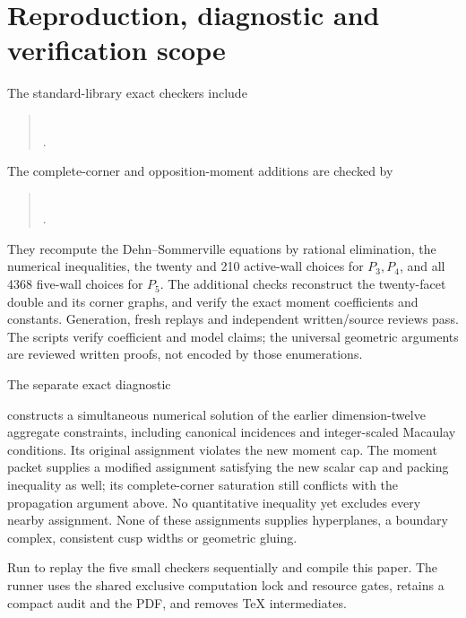 \documentclass[11pt]{article}
\begin{document}
\section{Reproduction, diagnostic and verification scope}
The standard-library exact checkers include
\begin{quote}\small
{}\\
.
\end{quote}
The complete-corner and opposition-moment additions are checked by
\begin{quote}\small
{}\\
.
\end{quote}
They recompute the Dehn--Sommerville equations by rational elimination,
the numerical inequalities, the twenty and 210 active-wall choices
for $P_3,P_4$, and all 4368 five-wall choices for $P_5$.
The additional checks reconstruct the twenty-facet double and its
corner graphs, and verify the exact moment coefficients and constants.
Generation, fresh replays and independent written/source reviews pass.
The scripts verify coefficient and model claims; the universal geometric
arguments are reviewed written proofs, not encoded by those enumerations.

The separate exact diagnostic
\begin{quote}\small
{}
\end{quote}
constructs a simultaneous numerical solution of the earlier dimension-twelve
aggregate constraints, including canonical incidences and integer-scaled
Macaulay conditions. Its original assignment violates the new moment
cap. The moment packet supplies a modified assignment satisfying the
new scalar cap and packing inequality as well; its complete-corner
saturation still conflicts with the propagation argument above.
No quantitative inequality yet excludes every nearby assignment.
None of these assignments supplies hyperplanes, a boundary complex,
consistent cusp widths or geometric gluing.

Run 
to replay the five small checkers sequentially and compile this paper.
The runner uses the shared exclusive computation lock and resource
gates, retains a compact audit and the PDF, and removes TeX intermediates.
\end{document}
